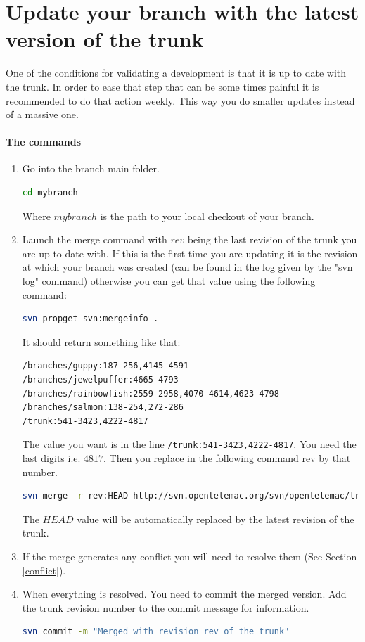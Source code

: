 \section{Update your branch with the latest version of the trunk}
%
One of the conditions for validating a development is that it is up to date
with the trunk.  In order to ease that step that can be some times painful it
is recommended to do that action weekly.  This way you do smaller updates
instead of a massive one.
\paragraph{The commands}
\begin{enumerate}
\item Go into the branch main folder.
\begin{lstlisting}[language=bash]
cd mybranch
\end{lstlisting}
Where $mybranch$ is the path to your local checkout of your branch.
\item Launch the merge command with $rev$ being the last revision of the trunk
you are up to date with. If this is the first time you are updating it is the
revision at which your branch was created (can be found in the log given by the
"svn log" command) otherwise you can get that value using the following
command:
\begin{lstlisting}[language=bash]
svn propget svn:mergeinfo .
\end{lstlisting}
It should return something like that:
\begin{lstlisting}[language=bash]
/branches/guppy:187-256,4145-4591
/branches/jewelpuffer:4665-4793
/branches/rainbowfish:2559-2958,4070-4614,4623-4798
/branches/salmon:138-254,272-286
/trunk:541-3423,4222-4817
\end{lstlisting}
The value you want is in the line \verb+/trunk:541-3423,4222-4817+. You need
the last digits i.e. $4817$.  Then you replace in the following command rev by
that number.
\begin{lstlisting}[language=bash]
svn merge -r rev:HEAD http://svn.opentelemac.org/svn/opentelemac/trunk .
\end{lstlisting}
The $HEAD$ value will be automatically replaced by the latest revision of the
trunk.
\item If the merge generates any conflict you will need to resolve them (See
Section \ref{conflict}).
\item When everything is resolved. You need to commit the merged version. Add
the trunk revision number to the commit message for information.
\begin{lstlisting}[language=bash]
svn commit -m "Merged with revision rev of the trunk"
\end{lstlisting}
\end{enumerate}
%
